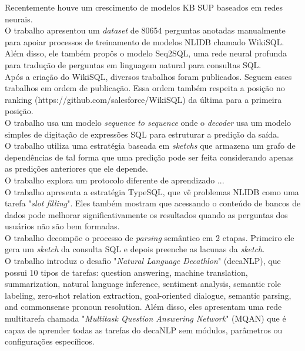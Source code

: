 \documentclass{article}
\begin{document}
Recentemente houve um crescimento de modelos KB SUP baseados em redes neurais.\\

O trabalho \citep{zhong2017seq2sql} apresentou um \textit{dataset} de 80654 perguntas anotadas manualmente para apoiar processos de treinamento de modelos NLIDB chamado WikiSQL. Além disso, ele também propôs o modelo Seq2SQL, uma rede neural profunda para tradução de perguntas em linguagem natural para consultas SQL. \\

Após a criação do WikiSQL, diversos trabalhos foram publicados. Seguem esses trabalhos em ordem de publicação. Essa ordem também respeita a posição no ranking (https://github.com/salesforce/WikiSQL) da última para a primeira posição.\\

O trabalho \citep{wang2018pointing} usa um modelo \textit{sequence to sequence} onde o \textit{decoder} usa um modelo simples de digitação de expressões SQL para estruturar a predição da saída. \\

O trabalho \citep{xu2017sqlnet} utiliza uma estratégia baseada em \textit{sketchs} que armazena um grafo de dependências de tal forma que uma predição pode ser feita considerando apenas as predições anteriores que ele depende. \\

O trabalho \citep{huang2018natural} explora um protocolo diferente de aprendizado ... \\

O trabalho \citep{yu2018typesql} apresenta a estratégia TypeSQL, que vê problemas NLIDB como uma tarefa "\textit{slot filling}". Eles também mostram que acessando o conteúdo de bancos de dados pode melhorar significativamente os resultados quando as perguntas dos usuários não são bem formadas. \\

O trabalho \citep{dong2018coarse} decompõe o processo de \textit{parsing} semântico em 2 etapas. Primeiro ele gera um \textit{sketch} da consulta SQL e depois preenche as lacunas da \textit{sketch}. \\

O trabalho \cite{mccann2018natural} introduz o desafio "\textit{Natural Language Decathlon}" (decaNLP), que possui 10 tipos de tarefas: question answering, machine translation, summarization, natural language inference, sentiment analysis, semantic role labeling, zero-shot relation extraction, goal-oriented dialogue, semantic parsing, and commonsense pronoun resolution. Além disso, eles apresentam uma rede multitarefa chamada "\textit{Multitask Question Answering Network}" (MQAN) que é capaz de aprender todas as tarefas do decaNLP sem módulos, parâmetros ou configurações específicos. \\
\end{document}
